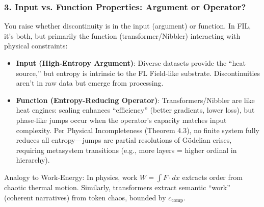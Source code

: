 \documentclass[11pt,letterpaper]{article}
\begin{document}
\subsubsection*{3. Input vs. Function Properties: Argument or Operator?}
You raise whether discontinuity is in the input (argument) or function. In FIL, it’s both, but primarily the function (transformer/Nibbler) interacting with physical constraints:
\begin{itemize}
    \item \textbf{Input (High-Entropy Argument)}: Diverse datasets provide the “heat source,” but entropy is intrinsic to the FL Field-like substrate. Discontinuities aren’t in raw data but emerge from processing.
    \item \textbf{Function (Entropy-Reducing Operator)}: Transformers/Nibbler are like heat engines: scaling enhances “efficiency” (better gradients, lower loss), but phase-like jumps occur when the operator’s capacity matches input complexity. Per Physical Incompleteness (Theorem 4.3), no finite system fully reduces all entropy—jumps are partial resolutions of Gödelian crises, requiring metasystem transitions (e.g., more layers = higher ordinal in hierarchy).
\end{itemize}
Analogy to Work-Energy: In physics, work $W = \int F \cdot dx$ extracts order from chaotic thermal motion. Similarly, transformers extract semantic “work” (coherent narratives) from token chaos, bounded by $c_{\text{comp}}$.
\end{document}
